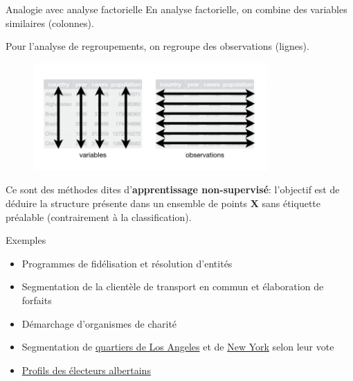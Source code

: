 \documentclass[
  ignorenonframetext,
]{beamer}
\providecommand{\tightlist}{%
  \setlength{\itemsep}{0pt}\setlength{\parskip}{0pt}}\usepackage{longtable,booktabs,array}
\begin{document}
\begin{frame}{Analogie avec analyse factorielle}
\protect\hypertarget{analogie-avec-analyse-factorielle}{}
En analyse factorielle, on combine des variables similaires (colonnes).

Pour l'analyse de regroupements, on regroupe des observations (lignes).

\begin{figure}

{\centering \includegraphics[width=0.8\textwidth,height=\textheight]{figures/tidy-data-sub.png}

}

\end{figure}

Ce sont des méthodes dites d'\textbf{apprentissage non-supervisé}:
l'objectif est de déduire la structure présente dans un ensemble de
points \(\mathbf{X}\) sans étiquette préalable (contrairement à la
classification).
\end{frame}

\begin{frame}{Exemples}
\protect\hypertarget{exemples}{}
\begin{itemize}
\tightlist
\item
  Programmes de fidélisation et résolution d'entités
\item
  Segmentation de la clientèle de transport en commun et élaboration de
  forfaits
\item
  Démarchage d'organismes de charité
\item
  Segmentation de
  \href{https://fivethirtyeight.com/features/the-6-political-neighborhoods-of-los-angeles/}{quartiers
  de Los Angeles} et de
  \href{https://fivethirtyeight.com/features/the-5-political-boroughs-of-new-york-city/}{New
  York} selon leur vote
\item
  \href{https://www.cbc.ca/news/canada/calgary/danielle-smith-alberta-moderate-middle-ucp-ndp-poll-1.6651460}{Profils
  des électeurs albertains}
\end{itemize}
\end{frame}
\end{document}
